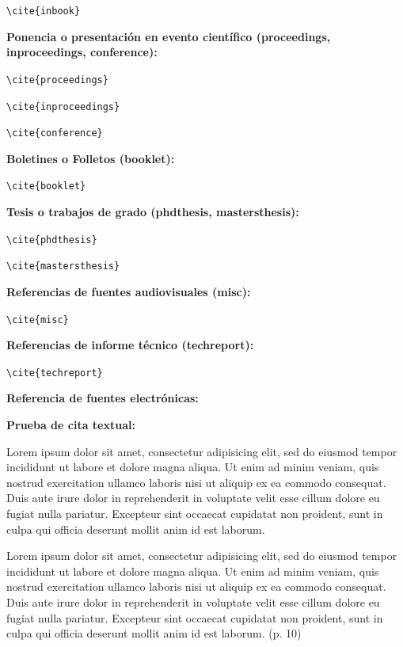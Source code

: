 \verb;\cite{inbook}; \cite{inbook}

\espaciodoble\textbf{Ponencia o presentación en evento científico (proceedings, inproceedings, conference):}

\verb;\cite{proceedings}; \cite{proceedings}

\verb;\cite{inproceedings}; \cite{inproceedings}

\verb;\cite{conference}; \cite{conference}

\espaciodoble\textbf{Boletines o Folletos (booklet):}

\verb;\cite{booklet}; \cite{booklet}

\espaciodoble\textbf{Tesis o trabajos de grado (phdthesis, mastersthesis):}

\verb;\cite{phdthesis}; \cite{phdthesis}

\verb;\cite{mastersthesis}; \cite{mastersthesis}

\espaciodoble\textbf{Referencias de fuentes audiovisuales (misc):}

\verb;\cite{misc}; \cite{misc}

\espaciodoble\textbf{Referencias de informe técnico (techreport):}

\verb;\cite{techreport}; \cite{techreport}

\espaciodoble\textbf{Referencia de fuentes electrónicas:}

\cite{causa2007computacion}

\break

\espaciodoble\textbf{Prueba de cita textual:}

Lorem ipsum dolor sit amet, consectetur adipisicing elit, sed do eiusmod tempor incididunt ut labore et dolore magna aliqua. Ut enim ad minim veniam, quis nostrud exercitation ullamco laboris nisi ut aliquip ex ea commodo consequat. Duis aute irure dolor in reprehenderit in voluptate velit esse cillum dolore eu fugiat nulla pariatur. Excepteur sint occaecat cupidatat non proident, sunt in culpa qui officia deserunt mollit anim id est laborum.

\begin{citatextual}
Lorem ipsum dolor sit amet, consectetur adipisicing elit, sed do eiusmod tempor incididunt ut labore et dolore magna aliqua. Ut enim ad minim veniam, quis nostrud exercitation ullamco laboris nisi ut aliquip ex ea commodo consequat. Duis aute irure dolor in reprehenderit in voluptate velit esse cillum dolore eu fugiat nulla pariatur. Excepteur sint occaecat cupidatat non proident, sunt in culpa qui officia deserunt mollit anim id est laborum.
(p. 10)
\end{citatextual}

